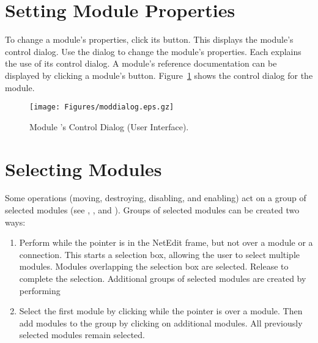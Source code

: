 \section{Setting Module Properties}
\label{sec:setmodprops}

\newcommand{\moddialog} {%
  \centerline{\texttt{[image: Figures/moddialog.eps.gz]}}
}
\begin{htmlonly}
  \newcommand{\moddialog}{%
    \htmladdimg[alt="SCIRun Module Dialog"]{../Figures/moddialog.gif}
  }
\end{htmlonly}

To change a module's properties, click its  button.
This displays the module's control dialog.  Use the dialog to change
the module's properties.  Each 
explains the use of its control dialog.  A module's reference
documentation can be displayed by clicking a module's 
button.  Figure~\ref{fig:moddialog} shows the control dialog for the
 module.

\begin{figure}[htb]
  \begin{makeimage}
  \end{makeimage}
  \moddialog
  \caption{\label{fig:moddialog} Module 's Control Dialog
    (User Interface).}
\end{figure}

\section{Selecting Modules}
\label{sec:selectmods}

Some operations (moving, destroying, disabling, and enabling) act on a group of
selected modules (see ,
, and ).  Groups of selected modules can be created two ways:

\begin{enumerate}
\item Perform  while the pointer is in the
  NetEdit frame, but not over a module or a connection. This starts a
  selection box, allowing the user to select multiple modules. 
  Modules overlapping the selection box are selected.  Release 
  to complete the selection.  Additional groups of selected modules
  are created by performing 
  
\item Select the first module by clicking  while the
  pointer is over a module.  Then add modules to the group by clicking
   on additional modules.  All previously selected
  modules remain selected.
\end{enumerate}

